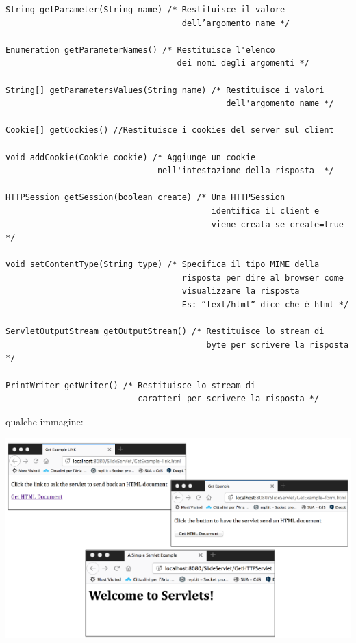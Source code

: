 \message{ !name(sd.tex)}\documentclass[a4paper,12pt, oneside]{book}
\begin{document}
\begin{verbatim}
String getParameter(String name) /* Restituisce il valore
                                    dell’argomento name */

Enumeration getParameterNames() /* Restituisce l'elenco 
                                   dei nomi degli argomenti */

String[] getParametersValues(String name) /* Restituisce i valori 
                                             dell'argomento name */

Cookie[] getCockies() //Restituisce i cookies del server sul client 

void addCookie(Cookie cookie) /* Aggiunge un cookie
                               nell'intestazione della risposta  */

HTTPSession getSession(boolean create) /* Una HTTPSession
                                          identifica il client e 
                                          viene creata se create=true */
                                          
void setContentType(String type) /* Specifica il tipo MIME della
                                    risposta per dire al browser come 
                                    visualizzare la risposta 
                                    Es: “text/html” dice che è html */
                                          
ServletOutputStream getOutputStream() /* Restituisce lo stream di 
                                         byte per scrivere la risposta */

PrintWriter getWriter() /* Restituisce lo stream di 
                           caratteri per scrivere la risposta */ 
\end{verbatim}
qualche immagine:
\begin{center}
	\includegraphics[scale=2.4]{img/servlet.png}
\end{center}
\end{document}
